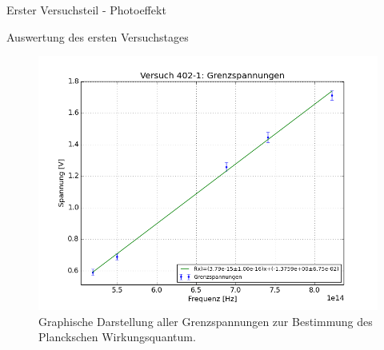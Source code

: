 \documentclass[pdftex, a4paper,11pt, twoside, ngerman]{report}
\begin{document}
\begin{chapter}{Erster Versuchsteil - Photoeffekt}
\begin{section}{Auswertung des ersten Versuchstages}
      \begin{figure}[ht]
        \begin{center}
          \includegraphics[width=\textwidth]
          {Figures/Versuch402_1_PlanckschesWirkungsquant.png}
          \caption{Graphische Darstellung aller Grenzspannungen zur Bestimmung
              des Planckschen Wirkungsquantum.}
          \label{fig:Versuch402_1_PlanckschesWirkungsquant}
        \end{center}
      \end{figure}
     
    \end{section}
   
   
   

\end{chapter}
\end{document}
